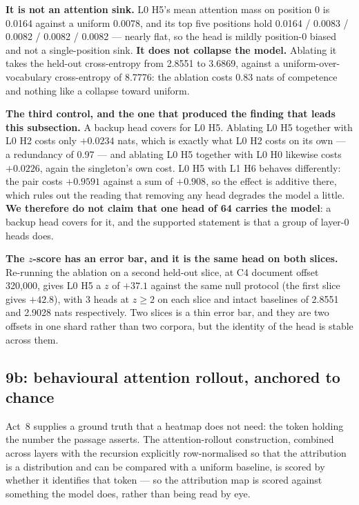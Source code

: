 \documentclass[11pt,a4paper]{article}
\begin{document}
\textbf{It is not an attention sink.} L0 H5's mean attention mass on position
0 is 0.0164 against a uniform 0.0078, and its top five positions hold
0.0164 / 0.0083 / 0.0082 / 0.0082 / 0.0082 --- nearly flat, so the head is
mildly position-0 biased and not a single-position sink. \textbf{It does not
collapse the model.} Ablating it takes the held-out cross-entropy from 2.8551
to 3.6869, against a uniform-over-vocabulary cross-entropy of 8.7776: the
ablation costs 0.83 nats of competence and nothing like a collapse toward
uniform. %

\textbf{The third control, and the one that produced the finding that leads
this subsection.} A backup head covers for L0 H5. Ablating L0 H5 together with
L0 H2 costs only $+0.0234$ nats, which is exactly what L0 H2 costs on its own
--- a redundancy of 0.97 --- and ablating L0 H5 together with L0 H0 likewise
costs $+0.0226$, again the singleton's own cost. L0 H5 with L1 H6 behaves
differently: the pair costs $+0.9591$ against a sum of $+0.908$, so the
effect is additive there, which rules out the reading that removing any head
degrades the model a little. %
\textbf{We therefore do not claim that one head of 64 carries the model}: a
backup head covers for it, and the supported statement is that a group of
layer-0 heads does.

\textbf{The $z$-score has an error bar, and it is the same head on both
slices.} Re-running the ablation on a second held-out slice, at C4 document
offset 320,000, gives L0 H5 a $z$ of $+37.1$ against the same null protocol
(the first slice gives $+42.8$), with 3 heads at $z \geq 2$ on each slice and
intact baselines of 2.8551 and 2.9028 nats respectively. Two slices is a thin
error bar, and they are two offsets in one shard rather than two corpora, but
the identity of the head is stable across them. %

\subsection{9b: behavioural attention rollout, anchored to chance}
\label{sec:act9b}

Act~8 supplies a ground truth that a heatmap does not need: the token holding
the number the passage asserts. The attention-rollout construction, combined
across layers with the recursion explicitly row-normalised so that the
attribution is a distribution and can be compared with a uniform baseline, is
scored by whether it identifies that token --- so the attribution map is scored
against something the model does, rather than being read by eye.
\end{document}
